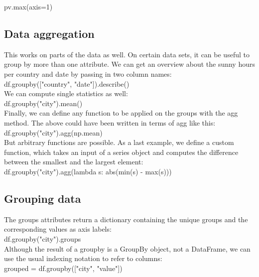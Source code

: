 \documentclass{article}
\numberwithin{equation}{section} %
\begin{document}
pv.max(axis=1) \\

\subsection*{Data aggregation}

This works on parts of the data as well. On certain data sets, it can be useful to group by more than one attribute. We can get an overview about the sunny hours per country and date by passing in two column names: \\

df.groupby(["country", "date"]).describe() \\

We can compute single statistics as well: \\

df.groupby("city").mean() \\

Finally, we can define any function to be applied on the groups with the agg method.
The above could have been written in terms of agg like this: \\

df.groupby("city").agg(np.mean) \\

But arbitrary functions are possible. As a last example, we define a custom function, which takes an input of a series object and computes the difference between the smallest and the largest element: \\

df.groupby("city").agg(lambda s: abs(min(s) - max(s))) \\


\subsection*{Grouping data}

The groups attributes return a dictionary containing the unique groups and
the corresponding values as axis labels: \\

df.groupby("city").groups \\

Although the result of a groupby is a GroupBy object, not a DataFrame, we
can use the usual indexing notation to refer to columns: \\

grouped = df.groupby(["city", "value"]) \\
\end{document}
